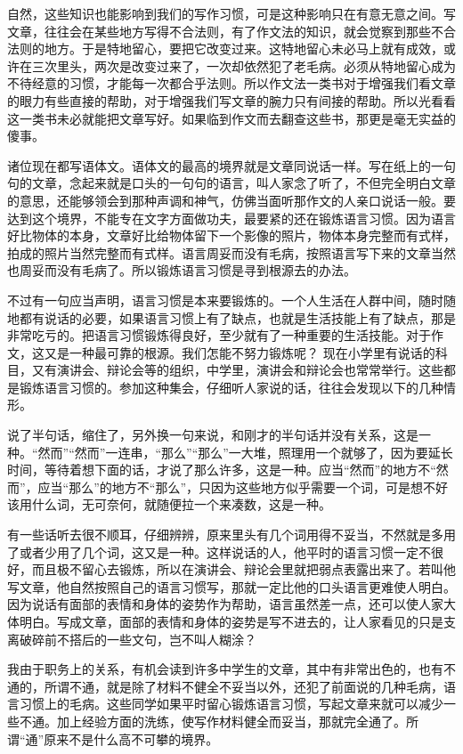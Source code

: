 \documentclass[fontset=fandol,12pt,a5paper]{ctexbook}
\begin{document}
自然，这些知识也能影响到我们的写作习惯，可是这种影响只在有意无意之间。写文章，往往会在某些地方写得不合法则，有了作文法的知识，就会觉察到那些不合法则的地方。于是特地留心，要把它改变过来。这特地留心未必马上就有成效，或许在三次里头，两次是改变过来了，一次却依然犯了老毛病。必须从特地留心成为不待经意的习惯，才能每一次都合乎法则。所以作文法一类书对于增强我们看文章的眼力有些直接的帮助，对于增强我们写文章的腕力只有间接的帮助。所以光看看这一类书未必就能把文章写好。如果临到作文而去翻查这些书，那更是毫无实益的傻事。

诸位现在都写语体文。语体文的最高的境界就是文章同说话一样。写在纸上的一句句的文章，念起来就是口头的一句句的语言，叫人家念了听了，不但完全明白文章的意思，还能够领会到那种声调和神气，仿佛当面听那作文的人亲口说话一般。要达到这个境界，不能专在文字方面做功夫，最要紧的还在锻炼语言习惯。因为语言好比物体的本身，文章好比给物体留下一个影像的照片，物体本身完整而有式样，拍成的照片当然完整而有式样。语言周妥而没有毛病，按照语言写下来的文章当然也周妥而没有毛病了。所以锻炼语言习惯是寻到根源去的办法。

不过有一句应当声明，语言习惯是本来要锻炼的。一个人生活在人群中间，随时随地都有说话的必要，如果语言习惯上有了缺点，也就是生活技能上有了缺点，那是非常吃亏的。把语言习惯锻炼得良好，至少就有了一种重要的生活技能。对于作文，这又是一种最可靠的根源。我们怎能不努力锻炼呢？
现在小学里有说话的科目，又有演讲会、辩论会等的组织，中学里，演讲会和辩论会也常常举行。这些都是锻炼语言习惯的。参加这种集会，仔细听人家说的话，往往会发现以下的几种情形。

说了半句话，缩住了，另外换一句来说，和刚才的半句话并没有关系，这是一种。“然而”“然而”一连串，“那么”“那么”一大堆，照理用一个就够了，因为要延长时间，等待着想下面的话，才说了那么许多，这是一种。应当“然而”的地方不“然而”，应当“那么”的地方不“那么”，只因为这些地方似乎需要一个词，可是想不好该用什么词，无可奈何，就随便拉一个来凑数，这是一种。

有一些话听去很不顺耳，仔细辨辨，原来里头有几个词用得不妥当，不然就是多用了或者少用了几个词，这又是一种。这样说话的人，他平时的语言习惯一定不很好，而且极不留心去锻炼，所以在演讲会、辩论会里就把弱点表露出来了。若叫他写文章，他自然按照自己的语言习惯写，那就一定比他的口头语言更难使人明白。因为说话有面部的表情和身体的姿势作为帮助，语言虽然差一点，还可以使人家大体明白。写成文章，面部的表情和身体的姿势是写不进去的，让人家看见的只是支离破碎前不搭后的一些文句，岂不叫人糊涂？

我由于职务上的关系，有机会读到许多中学生的文章，其中有非常出色的，也有不通的，所谓不通，就是除了材料不健全不妥当以外，还犯了前面说的几种毛病，语言习惯上的毛病。这些同学如果平时留心锻炼语言习惯，写起文章来就可以减少一些不通。加上经验方面的洗练，使写作材料健全而妥当，那就完全通了。所谓“通”原来不是什么高不可攀的境界。
\end{document}
